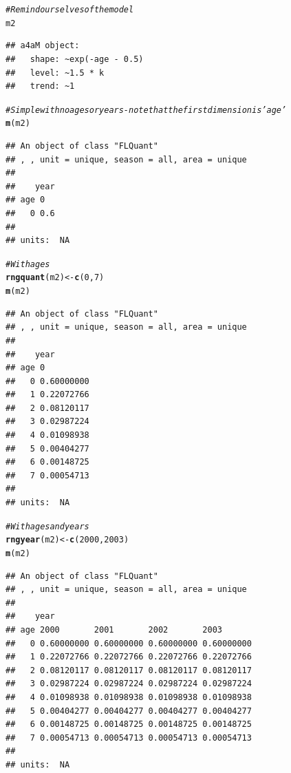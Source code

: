 \documentclass[a4paper,english,10pt]{article}\usepackage[]{graphicx}\usepackage[]{color}
\makeatletter
\newcommand{\hlnum}[1]{\textcolor[rgb]{0.686,0.059,0.569}{#1}}%
\newcommand{\hlcom}[1]{\textcolor[rgb]{0.678,0.584,0.686}{\textit{#1}}}%
\newcommand{\hlstd}[1]{\textcolor[rgb]{0.345,0.345,0.345}{#1}}%
\newcommand{\hlkwb}[1]{\textcolor[rgb]{0.69,0.353,0.396}{#1}}%
\newcommand{\hlkwd}[1]{\textcolor[rgb]{0.737,0.353,0.396}{\textbf{#1}}}%
\newenvironment{kframe}{%
 \def\at@end@of@kframe{}%
 \ifinner\ifhmode%
  \def\at@end@of@kframe{\end{minipage}}%
  \begin{minipage}{\columnwidth}%
 \fi\fi%
 \def\FrameCommand##1{\hskip\@totalleftmargin \hskip-\fboxsep
 \colorbox{shadecolor}{##1}\hskip-\fboxsep
     \hskip-\linewidth \hskip-\@totalleftmargin \hskip\columnwidth}%
 \MakeFramed {\advance\hsize-\width
   \@totalleftmargin\z@ \linewidth\hsize
   \@setminipage}}%
 {\par\unskip\endMakeFramed%
 \at@end@of@kframe}
\newenvironment{knitrout}{}{} %
\makeatother
\begin{document}
\begin{knitrout}
\color{fgcolor}\begin{kframe}
\begin{alltt}
\hlcom{# Remind ourselves of the model}
\hlstd{m2}
\end{alltt}
\begin{verbatim}
## a4aM object:
##   shape: ~exp(-age - 0.5)
##   level: ~1.5 * k
##   trend: ~1
\end{verbatim}
\begin{alltt}
\hlcom{# Simple with no ages or years - note that the first dimension is 'age'}
\hlkwd{m}\hlstd{(m2)}
\end{alltt}
\begin{verbatim}
## An object of class "FLQuant"
## , , unit = unique, season = all, area = unique
## 
##    year
## age 0  
##   0 0.6
## 
## units:  NA
\end{verbatim}
\begin{alltt}
\hlcom{# With ages}
\hlkwd{rngquant}\hlstd{(m2)} \hlkwb{<-} \hlkwd{c}\hlstd{(}\hlnum{0}\hlstd{,} \hlnum{7}\hlstd{)}
\hlkwd{m}\hlstd{(m2)}
\end{alltt}
\begin{verbatim}
## An object of class "FLQuant"
## , , unit = unique, season = all, area = unique
## 
##    year
## age 0         
##   0 0.60000000
##   1 0.22072766
##   2 0.08120117
##   3 0.02987224
##   4 0.01098938
##   5 0.00404277
##   6 0.00148725
##   7 0.00054713
## 
## units:  NA
\end{verbatim}
\begin{alltt}
\hlcom{# With ages and years}
\hlkwd{rngyear}\hlstd{(m2)} \hlkwb{<-} \hlkwd{c}\hlstd{(}\hlnum{2000}\hlstd{,} \hlnum{2003}\hlstd{)}
\hlkwd{m}\hlstd{(m2)}
\end{alltt}
\begin{verbatim}
## An object of class "FLQuant"
## , , unit = unique, season = all, area = unique
## 
##    year
## age 2000       2001       2002       2003      
##   0 0.60000000 0.60000000 0.60000000 0.60000000
##   1 0.22072766 0.22072766 0.22072766 0.22072766
##   2 0.08120117 0.08120117 0.08120117 0.08120117
##   3 0.02987224 0.02987224 0.02987224 0.02987224
##   4 0.01098938 0.01098938 0.01098938 0.01098938
##   5 0.00404277 0.00404277 0.00404277 0.00404277
##   6 0.00148725 0.00148725 0.00148725 0.00148725
##   7 0.00054713 0.00054713 0.00054713 0.00054713
## 
## units:  NA
\end{verbatim}
\begin{alltt}

\end{alltt}
\end{kframe}
\end{knitrout}
\end{document}
